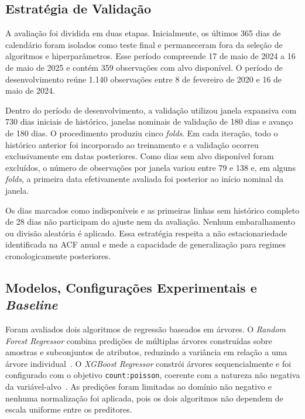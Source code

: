 \subsection{Estratégia de Validação}

A avaliação foi dividida em duas etapas. Inicialmente, os últimos 365 dias de calendário foram isolados como teste final e permaneceram fora da seleção de algoritmos e hiperparâmetros. Esse período compreende 17 de maio de 2024 a 16 de maio de 2025 e contém 359 observações com alvo disponível. O período de desenvolvimento reúne 1.140 observações entre 8 de fevereiro de 2020 e 16 de maio de 2024.

Dentro do período de desenvolvimento, a validação utilizou janela expansiva com 730 dias iniciais de histórico, janelas nominais de validação de 180 dias e avanço de 180 dias. O procedimento produziu cinco \textit{folds}. Em cada iteração, todo o histórico anterior foi incorporado ao treinamento e a validação ocorreu exclusivamente em datas posteriores. Como dias sem alvo disponível foram excluídos, o número de observações por janela variou entre 79 e 138 e, em alguns \textit{folds}, a primeira data efetivamente avaliada foi posterior ao início nominal da janela.

Os dias marcados como indisponíveis e as primeiras linhas sem histórico completo de 28 dias não participam do ajuste nem da avaliação. Nenhum embaralhamento ou divisão aleatória é aplicado. Essa estratégia respeita a não estacionariedade identificada na ACF anual e mede a capacidade de generalização para regimes cronologicamente posteriores.

\subsection{Modelos, Configurações Experimentais e \textit{Baseline}}

Foram avaliados dois algoritmos de regressão baseados em árvores. O \textit{Random Forest Regressor} combina predições de múltiplas árvores construídas sobre amostras e subconjuntos de atributos, reduzindo a variância em relação a uma árvore individual~\cite{breiman2001randomforest,biau2012randomforests}. O \textit{XGBoost Regressor} constrói árvores sequencialmente e foi configurado com o objetivo \texttt{count:poisson}, coerente com a natureza não negativa da variável-alvo~\cite{chen2016xgboost}. As predições foram limitadas ao domínio não negativo e nenhuma normalização foi aplicada, pois os dois algoritmos não dependem de escala uniforme entre os preditores.

